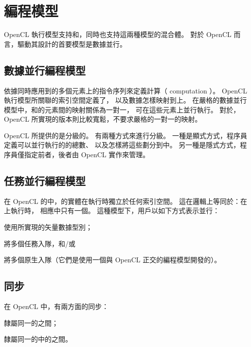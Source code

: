 \section{編程模型}
OpenCL 執行模型支持和，同時也支持這兩種模型的混合體。
對於 OpenCL 而言，驅動其設計的首要模型是數據並行。

\subsection{數據並行編程模型}

依據同時應用到的多個元素上的指令序列來定義計算（ computation ）。
OpenCL 執行模型所關聯的索引空間定義了，
以及數據怎樣映射到上。
在嚴格的數據並行模型中，和的元素間的映射關係為一對一，
可在這些元素上並行執行。
對於，OpenCL 所實現的版本則比較寬鬆，不要求嚴格的一對一的映射。

OpenCL 所提供的是分級的。
有兩種方式來進行分級。
一種是顯式方式，程序員定義可以並行執行的的總數、
以及怎樣將這些劃分到中。
另一種是隱式方式，程序員僅指定前者，後者由 OpenCL 實作來管理。

\subsection{任務並行編程模型}
在 OpenCL 的中，的實體在執行時獨立於任何索引空間。
這在邏輯上等同於：在上執行時，
相應中只有一個。
這種模型下，用戶以如下方式表示並行：
\startigBase
\item 使用所實現的矢量數據型別；
\item 將多個任務入隊，和/或
\item 將多個原生入隊（它們是使用一個與 OpenCL 正交的編程模型開發的）。
\stopigBase

\subsection{同步}
在 OpenCL 中，有兩方面的同步：
\startigBase
\item 隸屬同一的之間；
\item 隸屬同一的中的之間。
\stopigBase

